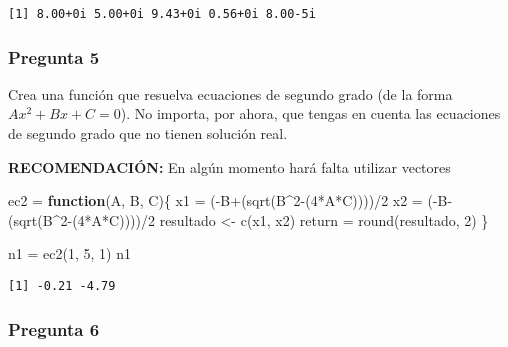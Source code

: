 \documentclass[
]{article}
\newenvironment{Shaded}{\begin{snugshade}}{\end{snugshade}}
\newcommand{\ControlFlowTok}[1]{\textcolor[rgb]{0.13,0.29,0.53}{\textbf{#1}}}
\newcommand{\DecValTok}[1]{\textcolor[rgb]{0.00,0.00,0.81}{#1}}
\newcommand{\FunctionTok}[1]{\textcolor[rgb]{0.00,0.00,0.00}{#1}}
\newcommand{\NormalTok}[1]{#1}
\newcommand{\OtherTok}[1]{\textcolor[rgb]{0.56,0.35,0.01}{#1}}
\newcommand{\SpecialCharTok}[1]{\textcolor[rgb]{0.00,0.00,0.00}{#1}}
\begin{document}
\begin{verbatim}
[1] 8.00+0i 5.00+0i 9.43+0i 0.56+0i 8.00-5i
\end{verbatim}

\hypertarget{pregunta-5}{%
\subsubsection{Pregunta 5}\label{pregunta-5}}

Crea una función que resuelva ecuaciones de segundo grado (de la forma
\(Ax^2 + Bx + C = 0\)). No importa, por ahora, que tengas en cuenta las
ecuaciones de segundo grado que no tienen solución real.

\textbf{RECOMENDACIÓN:} En algún momento hará falta utilizar vectores

\begin{Shaded}
\begin{Highlighting}[]
\NormalTok{ec2 }\OtherTok{=} \ControlFlowTok{function}\NormalTok{(A, B, C)\{}
\NormalTok{  x1 }\OtherTok{=}\NormalTok{ (}\SpecialCharTok{{-}}\NormalTok{B}\SpecialCharTok{+}\NormalTok{(}\FunctionTok{sqrt}\NormalTok{(B}\SpecialCharTok{\^{}}\DecValTok{2}\SpecialCharTok{{-}}\NormalTok{(}\DecValTok{4}\SpecialCharTok{*}\NormalTok{A}\SpecialCharTok{*}\NormalTok{C))))}\SpecialCharTok{/}\DecValTok{2}
\NormalTok{  x2 }\OtherTok{=}\NormalTok{ (}\SpecialCharTok{{-}}\NormalTok{B}\SpecialCharTok{{-}}\NormalTok{(}\FunctionTok{sqrt}\NormalTok{(B}\SpecialCharTok{\^{}}\DecValTok{2}\SpecialCharTok{{-}}\NormalTok{(}\DecValTok{4}\SpecialCharTok{*}\NormalTok{A}\SpecialCharTok{*}\NormalTok{C))))}\SpecialCharTok{/}\DecValTok{2}
\NormalTok{  resultado }\OtherTok{\textless{}{-}} \FunctionTok{c}\NormalTok{(x1, x2)}
\NormalTok{  return }\OtherTok{=} \FunctionTok{round}\NormalTok{(resultado, }\DecValTok{2}\NormalTok{)}
\NormalTok{\}}

\NormalTok{n1 }\OtherTok{=} \FunctionTok{ec2}\NormalTok{(}\DecValTok{1}\NormalTok{, }\DecValTok{5}\NormalTok{, }\DecValTok{1}\NormalTok{)}
\NormalTok{n1}
\end{Highlighting}
\end{Shaded}

\begin{verbatim}
[1] -0.21 -4.79
\end{verbatim}

\hypertarget{pregunta-6}{%
\subsubsection{Pregunta 6}\label{pregunta-6}}
\end{document}
